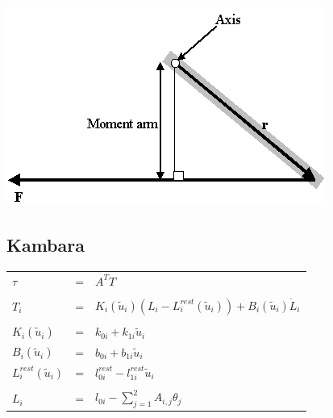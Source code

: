 \documentclass[pdftex,a4paper,11pt]{article}
\begin{document}
\begin{center}
        \includegraphics[width=.50\linewidth]{fig/moment_arm}
\end{center}

\subsection{Kambara}

\begin{tabular}{lcl}
    $\tau$ & = & $A^T T$ \\
    & & \\
    $T_i$                     & = & $K_i(\tilde{u}_i) (L_i - L_i^{rest}(\tilde{u}_i)) + B_i(\tilde{u}_i) \dot{L}_i$ \\
    & & \\
    $K_i(\tilde{u}_i)$        & = & $k_{0i} + k_{1i} \tilde{u}_i$ \\
    $B_i(\tilde{u}_i)$        & = & $b_{0i} + b_{1i} \tilde{u}_i$ \\
    $L_i^{rest}(\tilde{u}_i)$ & = & $ l_{0i}^{rest} - l_{1i}^{rest} \tilde{u}_i$ \\
    & & \\
    $L_i$ & = & $l_{0i} - \sum_{j=1}^2 A_{i,j} \theta_j $ \\
\end{tabular}
\end{document}

